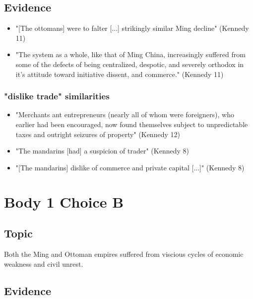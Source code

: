 \documentclass[letterpaper]{article}
\begin{document}
\subsection{Evidence}
\label{sec:org8f4b287}
\begin{itemize}
\item "[The ottomans] were to falter [...] strikingly similar Ming decline" (Kennedy 11)
\item "The system as a whole, like that of Ming China, increasingly suffered from some of the defects of being centralized, despotic, and severely orthodox in it's attitude toward initiative dissent, and commerce." (Kennedy 11)
\end{itemize}
\subsubsection{"dislike trade" similarities}
\label{sec:org37ec0ac}
\begin{itemize}
\item "Merchants ant entrepreneurs (nearly all of whom were foreigners), who earlier had been encouraged, now found themselves subject to unpredictable taxes and outright seizures of property" (Kennedy 12)
\item "The mandarins [had] a suspicion of trader" (Kennedy 8)
\item "[The mandarins] dislike of commerce and private capital [...]" (Kennedy 8)
\end{itemize}

\section{Body 1 Choice B}
\label{sec:orgcf0450d}
\subsection{Topic}
\label{sec:org2ce063f}
Both the Ming and Ottoman empires suffered from viscious cycles of economic weakness and civil unrest.

\subsection{Evidence}
\label{sec:orgf9f21b3}
\end{document}
